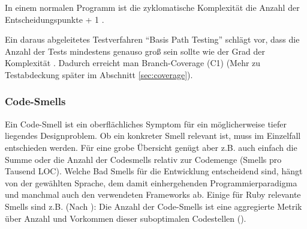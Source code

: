 
In einem normalen Programm ist die zyklomatische Komplexität die Anzahl der Entscheidungspunkte + 1 \citep[S. 314]{mccabe_complexity_1976}.

Ein daraus abgeleitetes Testverfahren "`Basis Path Testing"' schlägt vor, dass die Anzahl der Tests mindestens genauso groß sein sollte wie der Grad der Komplexität \citep[S. 318]{mccabe_complexity_1976}. Dadurch erreicht man Branch-Coverage (C1) (Mehr zu Testabdeckung später im Abschnitt \ref{sec:coverage}).

\subsubsection{Code-Smells}

  Ein Code-Smell ist ein oberflächliches Symptom für ein möglicherweise tiefer liegendes Designproblem. Ob ein konkreter Smell relevant ist, muss im Einzelfall entschieden werden. Für eine grobe Übersicht genügt aber z.B. auch einfach die Summe oder die Anzahl der Codesmells relativ zur Codemenge (Smells pro Tausend LOC). Welche Bad Smells für die Entwicklung entscheidend sind, hängt von der gewählten Sprache, dem damit einhergehenden Programmierparadigma und manchmal auch den verwendeten Frameworks ab. Einige für Ruby relevante Smells sind z.B. (Nach \citep{kevin_rutherford_code_2010}):
    Die Anzahl der Code-Smells ist eine aggregierte Metrik über Anzahl und Vorkommen dieser suboptimalen Codestellen ().

